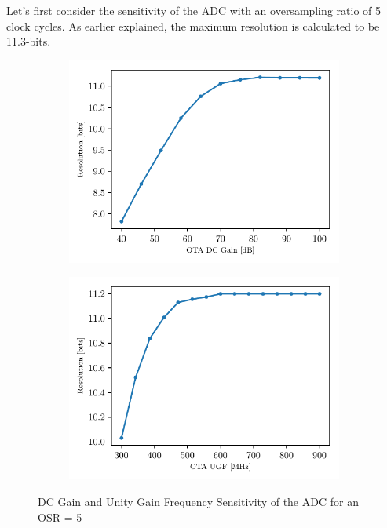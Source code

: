 Let's first consider the sensitivity of the ADC with an oversampling ratio of 5 clock cycles. As earlier explained, the maximum resolution is calculated to be 11.3-bits.
\begin{figure}[htp]
	\centering
	\begin{subfigure}[b]{0.48\textwidth}
		\centering
		\includegraphics[width=\textwidth]{Chapter4/Figs/results/adc/adc_OSR5_ota_dc_gain_800MHz.pdf}
		\label{fig:adc-osr5-gain}
	\end{subfigure}
	\begin{subfigure}[b]{0.48\textwidth}
		\centering
		\includegraphics[width=\textwidth]{Chapter4/Figs/results/adc/adc_OSR5_ota_ugf_80dB.pdf}
		\label{fig:adc-osr5-ugf}
	\end{subfigure}
	\caption{DC Gain and Unity Gain Frequency Sensitivity of the ADC for an OSR = 5}
	\label{fig:adc-osr5-sensitivity}
\end{figure}

